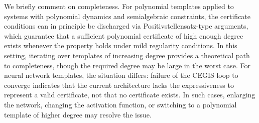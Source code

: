 We briefly comment on completeness. For polynomial templates applied to systems with polynomial dynamics and semialgebraic constraints, the certificate conditions can in principle be discharged via Positivstellensatz-type arguments, which guarantee that a sufficient polynomial certificate of high enough degree exists whenever the property holds under mild regularity conditions. In this setting, iterating over templates of increasing degree provides a theoretical path to completeness, though the required degree may be large in the worst case. For neural network templates, the situation differs: failure of the CEGIS loop to converge indicates that the current architecture lacks the expressiveness to represent a valid certificate, not that no certificate exists. In such cases, enlarging the network, changing the activation function, or switching to a polynomial template of higher degree may resolve the issue.

